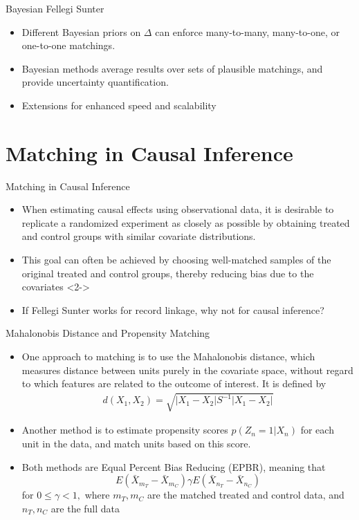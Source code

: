 \documentclass{beamer}
\begin{document}
\begin{frame}{Bayesian Fellegi Sunter}
	\begin{itemize}
		\item Different Bayesian priors on $\Delta$ can enforce many-to-many, many-to-one, or one-to-one matchings.
		\item Bayesian methods average results over sets of plausible matchings, and provide uncertainty quantification.
		\item Extensions for enhanced speed and scalability
	\end{itemize}
\end{frame}

\section{Matching in Causal Inference}

\begin{frame}{Matching in Causal Inference}
	\begin{itemize}
		\item When estimating causal effects using observational data, it is desirable to replicate a randomized experiment as closely as possible by obtaining treated and control groups with similar covariate distributions.
		\item This goal can often be achieved by choosing well-matched samples of the original treated and control groups, thereby reducing bias due to the covariates
		<2->\item If Fellegi Sunter works for record linkage, why not for causal inference?
	\end{itemize}
\end{frame}

\begin{frame}{Mahalonobis Distance and Propensity Matching}
	\begin{itemize}
		\item One approach to matching is to use the Mahalonobis distance, which measures distance between units purely in the covariate space, without regard to which features are related to the outcome of interest. It is defined by
		\begin{align*}
			d(X_1, X_2) = \sqrt{|X_1 - X_2| S^{-1} |X_1 - X_2|}
		\end{align*}
		\item Another method is to estimate propensity scores $p(Z_n = 1 |X_n)$ for each unit in the data, and match units based on this score.
		\item Both methods are Equal Percent Bias Reducing (EPBR), meaning that
			$$E(\bar{X}_{m_T} - \bar{X}_{m_C})  \gamma E(\bar{X}_{n_T} - \bar{X}_{n_C})$$
		for $0 \leq \gamma < 1,$ where $m_T, m_C$ are the matched treated and control data, and $n_T, n_C$ are the full data
	\end{itemize}
\end{frame}
\end{document}
